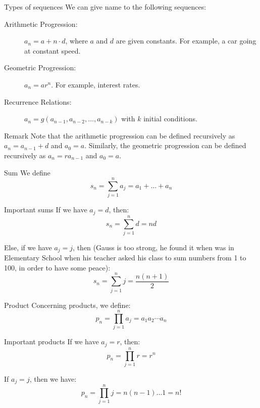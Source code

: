 \documentclass[a4paper]{article}
\begin{document}
\begin{parag}{Types of sequences}
    We can give name to the following sequences:
    \begin{description}
        \item[Arithmetic Progression:] $a_n = a + n\cdot d$, where $a$ and $d$ are given constants. For example, a car going at constant speed.
        \item[Geometric Progression:] $a_n = ar^{n}$. For example, interest rates.
        \item[Recurrence Relations:] $a_n = g\left(a_{n-1}, a_{n-2}, \ldots, a_{n-k}\right)$ with $k$ initial conditions.
    \end{description}

    \begin{subparag}{Remark}
        Note that the arithmetic progression can be defined recursively as $a_n = a_{n-1} + d$ and $a_0 = a$. Similarly, the geometric progression can be defined recursively as $a_n = ra_{n-1}$ and $a_0 = a$.
    \end{subparag}
\end{parag}

\begin{parag}{Sum}
    We define
    \[s_n = \sum_{j=1}^{n} a_j = a_1 + \ldots + a_n\]

    \begin{subparag}{Important sums}
        If we have $a_j = d$, then:
        \[s_n = \sum_{j=1}^{n} d = nd\]

        Else, if we have $a_j = j$, then (Gauss is too strong, he found it when was in Elementary School when his teacher asked his class to sum numbers from 1 to 100, in order to have some peace):
        \[s_n = \sum_{j=1}^{n} j = \frac{n\left(n+1\right)}{2} \]
    \end{subparag}
\end{parag}

\begin{parag}{Product}
    Concerning products, we define:
    \[p_n = \prod_{j=1}^{n} a_j = a_1 a_2 \cdots a_n\]

    \begin{subparag}{Important products}
        If we have $a_j = r$, then:
        \[p_n = \prod_{j=1}^{n} r = r^{n}\]

        If $a_j = j$, then we have:
        \[p_n = \prod_{j=1}^{n} j = n\left(n-1\right)\ldots1 = n!\]
    \end{subparag}
\end{parag}
\end{document}

